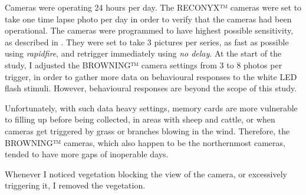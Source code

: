 

Cameras were operating 24 hours per day. The RECONYX™ cameras were set to take one time lapse photo per day in order to verify that the cameras had been operational.
The cameras were programmed to have highest possible sensitivity, as described in \cite{Odden2015}. %
 They were set to take 3 pictures per series, as fast as possible using \emph{rapidfire}, and retrigger immediately using \emph{no delay}.
At the start of the study, I adjusted the BROWNING™ camera settings from 3 to 8 photos per trigger, in order to gather more data on behavioural responses to the white LED flash stimuli. 
However, behavioural responses are beyond the scope of this study. %


Unfortunately, with such data heavy settings, memory cards are more vulnerable to filling up before being collected, in areas with sheep and cattle, or when cameras get triggered by grass or branches blowing in the wind. Therefore, the BROWNING™ cameras, which also happen to be the northernmost cameras, tended to have more gaps of inoperable days. %

Whenever I noticed vegetation blocking the view of the camera, or excessively triggering it, I removed the vegetation.









